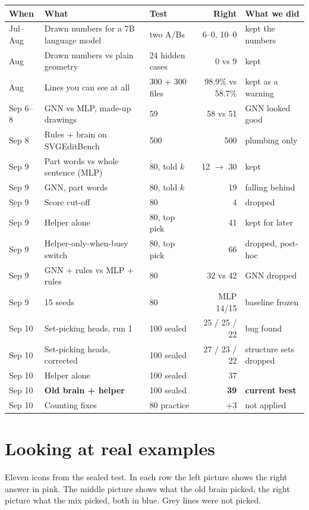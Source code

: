 \documentclass[11pt,a4paper]{article}
\begin{document}
\begin{center}
\footnotesize
\begin{tabular}{@{}p{1.5cm}p{4.9cm}p{2.5cm}rp{3.3cm}@{}}
\toprule
When & What & Test & Right & What we did \\
\midrule
Jul--Aug & Drawn numbers for a 7B language model & two A/Bs & 6--0, 10--0 & kept the numbers \\
Aug & Drawn numbers vs plain geometry & 24 hidden cases & 0 vs 9 & kept \\
Aug & Lines you can see at all & 300 + 300 files & 98.9\% vs 58.7\% & kept as a warning \\
Sep 6--8 & GNN vs MLP, made-up drawings & 59 & 58 vs 51 & GNN looked good \\
Sep 8 & Rules + brain on SVGEditBench & 500 & 500 & plumbing only \\
Sep 9 & Part words vs whole sentence (MLP) & 80, told $k$ & 12 $\to$ 30 & kept \\
Sep 9 & GNN, part words & 80, told $k$ & 19 & falling behind \\
Sep 9 & Score cut-off & 80 & 4 & dropped \\
Sep 9 & Helper alone & 80, top pick & 41 & kept for later \\
Sep 9 & Helper-only-when-busy switch & 80, top pick & 66 & dropped, post-hoc \\
Sep 9 & GNN + rules vs MLP + rules & 80 & 32 vs 42 & GNN dropped \\
Sep 9 & 15 seeds & 80 & MLP 14/15 & baseline frozen \\
Sep 10 & Set-picking heads, run 1 & 100 sealed & 25 / 25 / 22 & bug found \\
Sep 10 & Set-picking heads, corrected & 100 sealed & 27 / 23 / 22 & structure sets dropped \\
Sep 10 & Helper alone & 100 sealed & 37 & \\
Sep 10 & \textbf{Old brain + helper} & 100 sealed & \textbf{39} & \textbf{current best} \\
Sep 10 & Counting fixes & 80 practice & +3 & not applied \\
\bottomrule
\end{tabular}
\end{center}

\section*{Looking at real examples}

Eleven icons from the sealed test. In each row the left picture shows the right answer in pink. The middle picture shows what the old brain picked, the right picture what the mix picked, both in blue. Grey lines were not picked.
\end{document}
